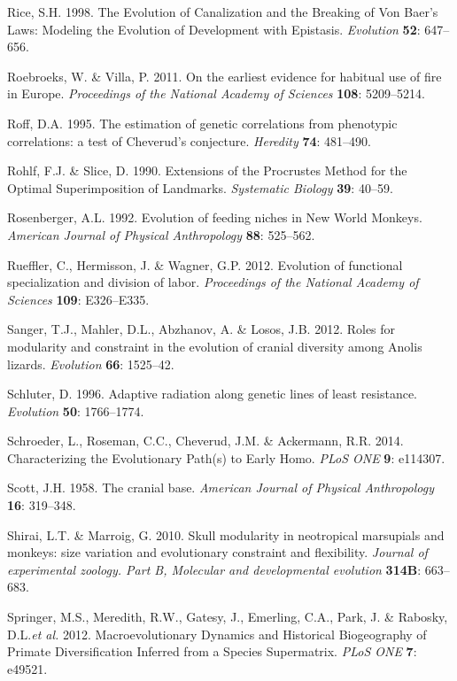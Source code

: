 \documentclass[12pt,twoside]{report}
\begin{document}
Rice, S.H. 1998. The Evolution of Canalization and the Breaking of Von
Baer's Laws: Modeling the Evolution of Development with Epistasis.
\emph{Evolution} \textbf{52}: 647--656.

Roebroeks, W. \& Villa, P. 2011. On the earliest evidence for habitual
use of fire in Europe. \emph{Proceedings of the National Academy of
Sciences} \textbf{108}: 5209--5214.

Roff, D.A. 1995. The estimation of genetic correlations from phenotypic
correlations: a test of Cheverud's conjecture. \emph{Heredity}
\textbf{74}: 481--490.

Rohlf, F.J. \& Slice, D. 1990. Extensions of the Procrustes Method for
the Optimal Superimposition of Landmarks. \emph{Systematic Biology}
\textbf{39}: 40--59.

Rosenberger, A.L. 1992. Evolution of feeding niches in New World
Monkeys. \emph{American Journal of Physical Anthropology} \textbf{88}:
525--562.

Rueffler, C., Hermisson, J. \& Wagner, G.P. 2012. Evolution of
functional specialization and division of labor. \emph{Proceedings of
the National Academy of Sciences} \textbf{109}: E326--E335.

Sanger, T.J., Mahler, D.L., Abzhanov, A. \& Losos, J.B. 2012. Roles for
modularity and constraint in the evolution of cranial diversity among
Anolis lizards. \emph{Evolution} \textbf{66}: 1525--42.

Schluter, D. 1996. Adaptive radiation along genetic lines of least
resistance. \emph{Evolution} \textbf{50}: 1766--1774.

Schroeder, L., Roseman, C.C., Cheverud, J.M. \& Ackermann, R.R. 2014.
Characterizing the Evolutionary Path(s) to Early Homo. \emph{PLoS ONE}
\textbf{9}: e114307.

Scott, J.H. 1958. The cranial base. \emph{American Journal of Physical
Anthropology} \textbf{16}: 319--348.

Shirai, L.T. \& Marroig, G. 2010. Skull modularity in neotropical
marsupials and monkeys: size variation and evolutionary constraint and
flexibility. \emph{Journal of experimental zoology. Part B, Molecular
and developmental evolution} \textbf{314B}: 663--683.

Springer, M.S., Meredith, R.W., Gatesy, J., Emerling, C.A., Park, J. \&
Rabosky, D.L.\emph{et al.} 2012. Macroevolutionary Dynamics and
Historical Biogeography of Primate Diversification Inferred from a
Species Supermatrix. \emph{PLoS ONE} \textbf{7}: e49521.
\end{document}
